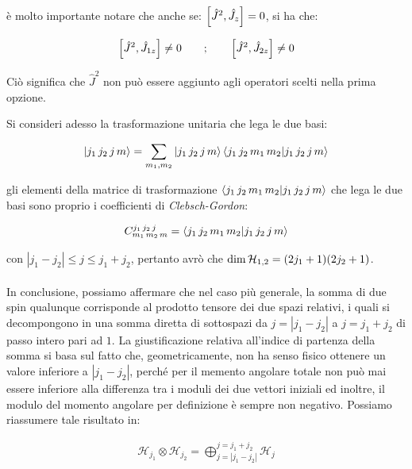\begin{enumerate}[label=\arabic*)]
		è molto importante notare che anche se: $\qty[\hat{J}^2, \hat{J}_z] = 0$, si ha che:
		
	\begin{align*}
		\qty[\hat{J}^2, \hat{J}_{1z}] \neq 0 \qquad ; \qquad \qty[\hat{J}^2, \hat{J}_{2z}] \neq 0
	\end{align*}
	
		Ciò significa che $\hat{J}^2$ non può essere aggiunto agli operatori scelti nella prima opzione.

\end{enumerate}

	Si consideri adesso la trasformazione unitaria che lega le due basi: 
	
\begin{align*}
	\ket{j_1 \, j_2  \, j \, m} = \sum_{m_1, m_2} \ket{j_1 \, j_2  \, j \, m} \braket{ j_1 \, j_2 \, m_1 \, m_2 }{ j_1 \, j_2 \, j \, m}
\end{align*}
 	
	gli elementi della matrice di trasformazione $\braket{ j_1 \, j_2 \, m_1 \, m_2 }{ j_1 \, j_2 \, j \, m}$ che lega le due basi sono proprio i coefficienti di \textit{Clebsch-Gordon}:
	
\begin{align*}
	C_{m_1 \, m_2 \, m}^{j_1 \, j_2 \, j} = \braket{ j_1 \, j_2 \, m_1 \, m_2 }{ j_1 \, j_2 \, j \, m}
\end{align*}

	con $|j_1 - j_2| \leq j \leq j_1 + j_2$, pertanto avrò che $\dim \mathcal{H}_{1, 2} = \qty(2j_1 + 1) \qty(2j_2 + 1)$.
	\\
	\\
	In conclusione, possiamo affermare che nel caso più generale, la somma di due spin qualunque corrisponde al prodotto tensore dei due spazi relativi, i quali si decompongono in una somma diretta di sottospazi da $j = |j_1 - j_2|$ a $j = j_1 + j_2$ di passo intero pari ad $1$. La giustificazione relativa all'indice di partenza della somma si basa sul fatto che, geometricamente, non ha senso fisico ottenere un valore inferiore a $ |j_1 - j_2|$, perché per il memento angolare totale non può mai essere inferiore alla differenza tra i moduli dei due vettori iniziali ed inoltre, il modulo del momento angolare per definizione è sempre non negativo. Possiamo riassumere tale risultato in:
	
\begin{mydef}
	
\begin{align*}
	\mathcal{H}_{j_1} \otimes \mathcal{H}_{j_2} = \bigoplus_{j = |j_1 - j_2|}^{j = j_1 + j_2} \mathcal{H}_j
\end{align*}

\end{mydef}

